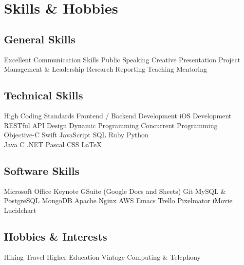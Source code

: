 \vspace{-2\bigskipamount}
\section{Skills \& Hobbies}
\small

\subsection{General Skills}
\chevron{} Excellent Communication Skills
\chevron{} Public Speaking
\chevron{} Creative Presentation
\chevron{} Project Management \& Leadership
\chevron{} Research
\chevron{} Reporting
\chevron{} Teaching
\chevron{} Mentoring
\medskip

\subsection{Technical Skills}
\chevron{} High Coding Standards
\chevron{} Frontend / Backend Development
\chevron{} iOS Development~
\chevron{} RESTful API Design
\chevron{} Dynamic Programming
\chevron{} Concurrent Programming
\chevron{} Objective-C
\chevron{} Swift
\chevron{} JavaScript
\chevron{} SQL
\chevron{} Ruby
\chevron{} Python
\chevron{} \Csh{}\\
\chevron{} Java
\chevron{} C
\chevron{} \Cpp{}
\chevron{} .NET
\chevron{} Pascal
\chevron{} CSS
\chevron{} {\rmfamily\LaTeX}
\medskip

\subsection{Software Skills}
\chevron{} Microsoft Office
\chevron{} Keynote
\chevron{} GSuite (Google Docs and Sheets)
\chevron{} Git
\chevron{} MySQL \& PostgreSQL
\chevron{} MongoDB
\chevron{} Apache
\chevron{} Nginx
\chevron{} AWS
\chevron{} Emacs
\chevron{} Trello
\chevron{} Pixelmator
\chevron{} iMovie
\chevron{} Lucidchart
\medskip

\subsection{Hobbies \& Interests}
\chevron{} Hiking
\chevron{} Travel
\chevron{} Higher Education
\chevron{} Vintage Computing \& Telephony


